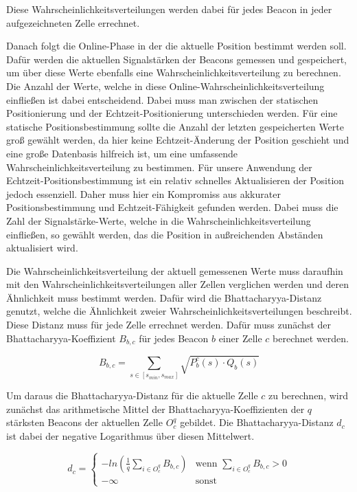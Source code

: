 Diese Wahrscheinlichkeitsverteilungen werden dabei für jedes Beacon in jeder aufgezeichneten Zelle errechnet.

Danach folgt die Online-Phase in der die aktuelle Position bestimmt werden soll. Dafür werden die aktuellen Signalstärken der Beacons gemessen und gespeichert, um über diese Werte ebenfalls eine Wahrscheinlichkeitsverteilung zu berechnen. Die Anzahl der Werte, welche in diese Online-Wahrscheinlichkeitsverteilung einfließen ist dabei entscheidend.
Dabei muss man zwischen der statischen Positionierung und der Echtzeit-Positionierung unterschieden werden.
Für eine statische Positionsbestimmung sollte die Anzahl der letzten gespeicherten Werte groß gewählt werden, da hier keine Echtzeit-Änderung der Position geschieht und eine große Datenbasis hilfreich ist, um eine umfassende Wahrscheinlichkeitsverteilung zu bestimmen.
Für unsere Anwendung der Echtzeit-Positionsbestimmung ist ein relativ schnelles Aktualisieren der Position jedoch essenziell. Daher muss hier ein Kompromiss aus akkurater Positionsbestimmung und Echtzeit-Fähigkeit gefunden werden. Dabei muss die Zahl der Signalstärke-Werte, welche in die Wahrscheinlichkeitsverteilung einfließen, so gewählt werden, das die Position in außreichenden Abständen aktualisiert wird.

Die Wahrscheinlichkeitsverteilung der aktuell gemessenen Werte muss daraufhin mit den Wahrscheinlichkeitsverteilungen aller Zellen verglichen werden und deren Ähnlichkeit muss bestimmt werden. Dafür wird die Bhattacharyya-Distanz genutzt, welche die Ähnlichkeit zweier Wahrscheinlichkeitsverteilungen beschreibt. 
Diese Distanz muss für jede Zelle errechnet werden. 
Dafür muss zunächst der Bhattacharyya-Koeffizient $B_{b, c}$ für jedes Beacon $b$ einer Zelle $c$ berechnet werden.

\begin{equation}
	B_{b, c} = \sum_{s \in [s_{min},s_{max}]} \sqrt{P_{b}^{c}(s) \cdot Q_{b}(s)}
\end{equation}

Um daraus die Bhattacharyya-Distanz für die aktuelle Zelle $c$ zu berechnen, wird zunächst das arithmetische Mittel der Bhattacharyya-Koeffizienten der $q$ stärksten Beacons der aktuellen Zelle $O_{c}^{q}$ gebildet. Die Bhattacharyya-Distanz $d_{c}$ ist dabei der negative Logarithmus über diesen Mittelwert.

\begin{equation}
	d_{c}= \begin{cases}
	-ln (\frac{1}{q} \sum_{i \in O_{c}^{q}} B_{b, c}) & \text{wenn } \sum_{i \in O_{c}^{q}} B_{b, c} > 0 \\
	- \infty & \text{sonst}
	\end{cases}
\end{equation}

